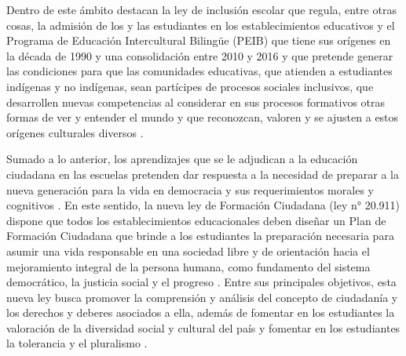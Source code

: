 \documentclass[12pt,twoside]{templates/facsothesis}
\begin{document}
Dentro de este ámbito destacan la ley de inclusión escolar que regula, entre otras cosas, la admisión de los y las estudiantes en los establecimientos educativos \citep{bibliotecadelcongresonacional_ley_2015} y el Programa de Educación Intercultural Bilingüe (PEIB) que tiene sus orígenes en la década de 1990 y una consolidación entre 2010 y 2016 y que pretende generar las condiciones para que las comunidades educativas, que atienden a estudiantes indígenas y no indígenas, sean partícipes de procesos sociales inclusivos, que desarrollen nuevas competencias al considerar en sus procesos formativos otras formas de ver y entender el mundo y que reconozcan, valoren y se ajusten a estos orígenes culturales diversos \citep{ministeriodeeducacion_Programa_2017}.

Sumado a lo anterior, los aprendizajes que se le adjudican a la educación ciudadana en las escuelas pretenden dar respuesta a la necesidad de preparar a la nueva generación para la vida en democracia y sus requerimientos morales y cognitivos \citep{cox_objetivos_2015}. En este sentido, la nueva ley de Formación Ciudadana (ley n° 20.911) dispone que todos los establecimientos educacionales deben diseñar un Plan de Formación Ciudadana que brinde a los estudiantes la preparación necesaria para asumir una vida responsable en una sociedad libre y de orientación hacia el mejoramiento integral de la persona humana, como fundamento del sistema democrático, la justicia social y el progreso \citep{bibliotecadelcongresonacional_plan_2016}. Entre sus principales objetivos, esta nueva ley busca promover la comprensión y análisis del concepto de ciudadanía y los derechos y deberes asociados a ella, además de fomentar en los estudiantes la valoración de la diversidad social y cultural del país y fomentar en los estudiantes la tolerancia y el pluralismo \citep{bibliotecadelcongresonacional_plan_2016}.
\end{document}
